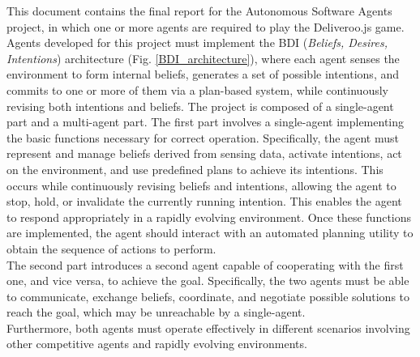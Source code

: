     This document contains the final report for the Autonomous Software Agents project, in which one or more agents are required to play the Deliveroo.js game. Agents developed for this project must implement the BDI (\textit{Beliefs, Desires, Intentions}) architecture (Fig. \ref{BDI_architecture}), where each agent senses the environment to form internal beliefs, generates a set of possible intentions, and commits to one or more of them via a plan-based system, while continuously revising both intentions and beliefs.
    The project is composed of a single-agent part and a multi-agent part. The first part involves a single-agent implementing the basic functions necessary for correct operation. Specifically, the agent must represent and manage beliefs derived from sensing data, activate intentions, act on the environment, and use predefined plans to achieve its intentions. This occurs while continuously revising beliefs and intentions, allowing the agent to stop, hold, or invalidate the currently running intention. This enables the agent to respond appropriately in a rapidly evolving environment. Once these functions are implemented, the agent should interact with an automated planning utility to obtain the sequence of actions to perform.
    \medskip\\      
    The second part introduces a second agent capable of cooperating with the first one, and vice versa, to achieve the goal. Specifically, the two agents must be able to communicate, exchange beliefs, coordinate, and negotiate possible solutions to reach the goal, which may be unreachable by a single-agent.
    \medskip\\
    Furthermore, both agents must operate effectively in different scenarios involving other competitive agents and rapidly evolving environments.
